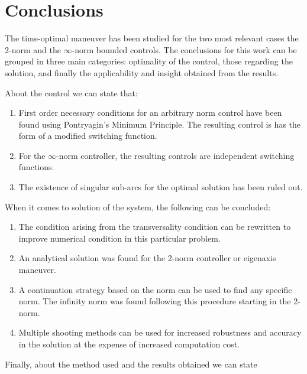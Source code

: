 \section{Conclusions}
The time-optimal maneuver has been studied for the two most relevant cases the 2-norm and the $\infty$-norm bounded controls. The conclusions for this work can be grouped in three main categories: optimality of the control, those regarding the solution, and finally the applicability and insight obtained from the results.

About the control we can state that:
\begin{enumerate}
	\item First order necessary conditions for an arbitrary norm control have been found using Pontryagin's Minimum Principle. The resulting control is has the form of a modified switching function.
	
	\item For the $\infty$-norm controller, the resulting controls are independent switching functions.
	
	\item The existence of singular sub-arcs for the optimal solution has been ruled out.
\end{enumerate}

When it comes to solution of the system, the following can be concluded:
\begin{enumerate}
	\item The condition arising from the transversality condition can be rewritten to improve numerical condition in this particular problem.
	
	\item An analytical solution was found for the 2-norm controller or eigenaxis maneuver.
	
	\item A continuation strategy based on the norm can be used to find any specific norm. The infinity norm was found following this procedure starting in the 2-norm.
	
	\item Multiple shooting methods can be used for increased robustness and accuracy in the solution at the expense of increased computation cost.
\end{enumerate}
	
Finally, about the method used and the results obtained we can state

